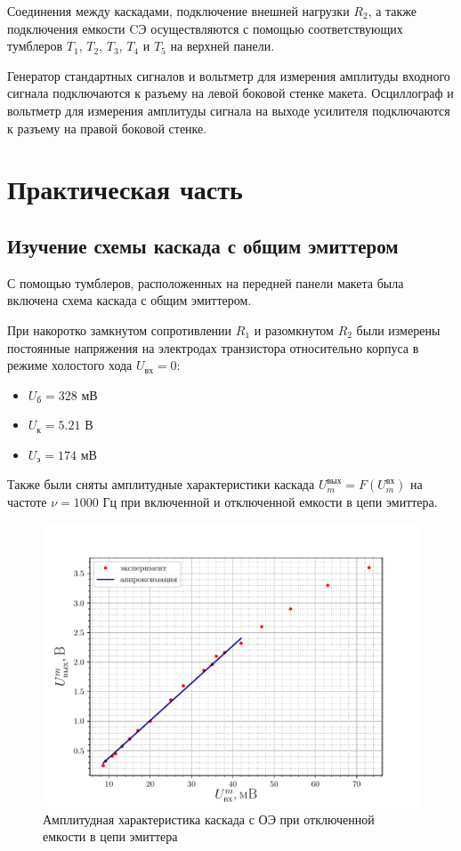Соединения между каскадами, подключение внешней нагрузки $R_2$, а также подключения емкости CЭ осуществляются с помощью соответствующих тумблеров $T_1$, $T_2$, $T_3$, $T_4$ и $T_5$ на верхней панели.

Генератор стандартных сигналов и вольтметр для измерения амплитуды входного сигнала подключаются к разъему на левой боковой стенке макета. Осциллограф и вольтметр для измерения амплитуды сигнала на выходе усилителя подключаются к разъему на правой боковой стенке.

\section{Практическая часть}
\subsection{Изучение схемы каскада с общим эмиттером}
С помощью тумблеров, расположенных на передней панели макета была включена схема каскада с общим эмиттером. 

При накоротко замкнутом сопротивлении $R_1$ и разомкнутом $R_2$
были измерены постоянные напряжения на электродах транзистора относительно корпуса в режиме холостого хода $U_{\text{вх}}=0$:
\begin{itemize}
	\item $U_{\text{б}}=328$ мВ
	\item  $U_{\text{к}}= 5.21 $ В
	\item $U_{\text{э}}= 174$ мВ 
\end{itemize}

Также были сняты амплитудные характеристики каскада 
$U^{\text{вых}}_{m}= F(U^{\text{вх}}_m)$ на частоте $\nu=1000$ Гц при включенной и отключенной емкости в цепи эмиттера.

\begin{figure}[H]
 	\centering
 	\includegraphics[width=\linewidth]{fig/3_C_off.pdf}
 	\caption{Амплитудная характеристика каскада с ОЭ при отключенной емкости в цепи эмиттера}
 	\label{fig:Coff1}
 \end{figure} 


